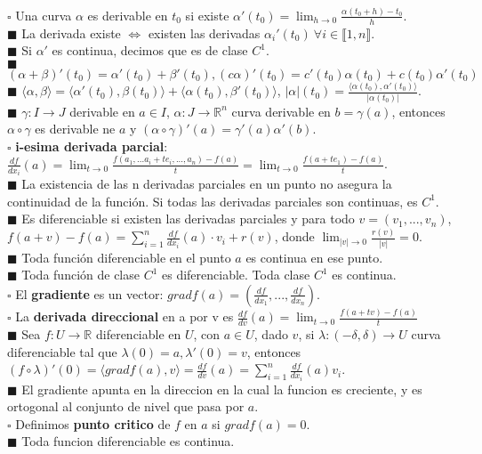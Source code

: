 \documentclass[11pt,a4paper]{article}
\begin{document}
\dotfill\\

$\square$ Una curva $\alpha$ es derivable en $t_0$ si existe $\alpha'(t_0) = \lim_{h\to 0} \frac{\alpha(t_0 + h) - t_0}{h}$.\\
$\blacksquare$ La derivada existe $\iff$ existen las derivadas $\alpha_i'(t_0) \ \forall i \in \llbracket 1, n \rrbracket$.\\
$\blacksquare$ Si $\alpha'$ es continua, decimos que es de clase $C^1$.\\
$\blacksquare$ $(\alpha + \beta)'(t_0) = \alpha'(t_0) + \beta'(t_0), (c\alpha)'(t_0) = c'(t_0)\alpha(t_0) + c(t_0)\alpha'(t_0)$\\
$\blacksquare$ $\langle \alpha, \beta \rangle = \langle \alpha'(t_0),\beta(t_0) \rangle + \langle \alpha(t_0), \beta'(t_0) \rangle$, $|\alpha|(t_0) = \frac{\langle \alpha(t_0), \alpha'(t_0) \rangle}{|\alpha(t_0)|}$.\\
$\blacksquare$ $\gamma : I \rightarrow J$ derivable en $a \in I$, $\alpha : J \rightarrow \mathbb{R}^n$ curva derivable en $b = \gamma(a)$, entonces $\alpha \circ \gamma$ es derivable ne $a$ y $(\alpha \circ \gamma)'(a) = \gamma'(a)\alpha'(b).$\\
$\square$ \textbf{i-esima derivada parcial}: $\frac{df}{dx_i}(a) = \lim_{t \to 0} \frac{f(a_1, ... a_i+te_i, ..., a_n) - f(a)}{t} = \lim_{t \to 0} \frac{f(a+te_1) - f(a)}{t}$.\\
$\blacksquare$ La existencia de las n derivadas parciales en un punto no asegura la continuidad de la funci\'on. Si todas las derivadas parciales son continuas, es $C^1$.\\
$\blacksquare$ Es diferenciable si existen las derivadas parciales y para todo $v=(v_1,...,v_n)$, $f(a+v)-f(a) = \sum_{i=1}^n \frac{df}{dx_i}(a)\cdot v_i + r(v)$, donde $\lim_{|v| \to 0} \frac{r(v)}{|v|} = 0$.\\
$\blacksquare$ Toda funci\'on diferenciable en el punto $a$ es continua en ese punto.\\
$\blacksquare$ Toda funci\'on de clase $C^1$ es diferenciable. Toda clase $C^1$ es continua.\\
$\square$ El \textbf{gradiente} es un vector: $grad f(a) = (\frac{df}{dx_1}, ..., \frac{df}{dx_n})$.\\
$\square$ La \textbf{derivada direccional} en a por v es $\frac{df}{dv}(a) = \lim_{t \to 0} \frac{f(a+tv) - f(a)}{t}$\\
$\blacksquare$ Sea $f: U \rightarrow \mathbb{R}$ diferenciable en $U$, con $a \in U$, dado $v$, si $\lambda : (-\delta, \delta) \rightarrow U$ curva diferenciable tal que $\lambda(0) = a, \lambda'(0) = v$, entonces $(f \circ \lambda)'(0) = \langle grad f (a), v \rangle = \frac{df}{dv}(a) = \sum_{i=1}^n \frac{df}{dx_i}(a)v_i$.\\
$\blacksquare$ El gradiente apunta en la direccion en la cual la funcion es creciente, y es ortogonal al conjunto de nivel que pasa por $a$.\\
$\square$ Definimos \textbf{punto critico} de $f$ en $a$ si $grad f(a) = 0$.\\
$\blacksquare$ Toda funcion diferenciable es continua.
\end{document}
